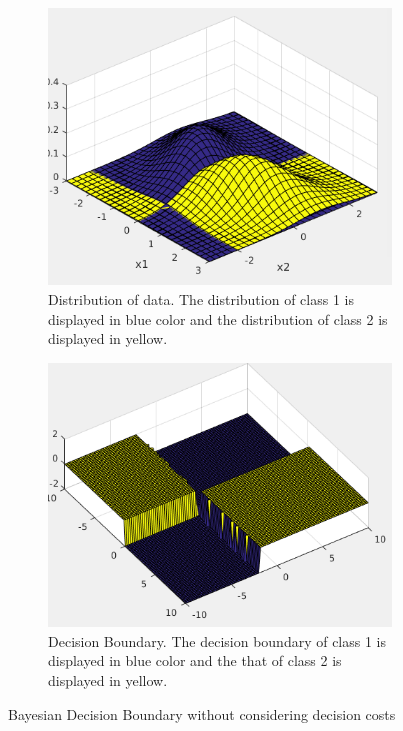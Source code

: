 \documentclass[12pt]{article}
\begin{document}
\begin{enumerate}
\begin{figure}[h]
\centering
\begin{subfigure}{0.35\textwidth}
\includegraphics[scale=0.3]{Imgs/hw1-1-1.png}
\caption{Distribution of data. The distribution of class 1 is displayed in blue color and the distribution of class 2 is displayed in yellow.}
\end{subfigure}
\begin{subfigure}{0.35\textwidth}
\includegraphics[scale=0.3]{Imgs/hw1-1-2.png}
\caption{Decision Boundary. The decision boundary of class 1 is displayed in blue color and the that of class 2 is displayed in yellow.}
\end{subfigure}
\caption{Bayesian Decision Boundary without considering decision costs}
\label{fig:1}
\end{figure}




\end{enumerate}
\end{document}
